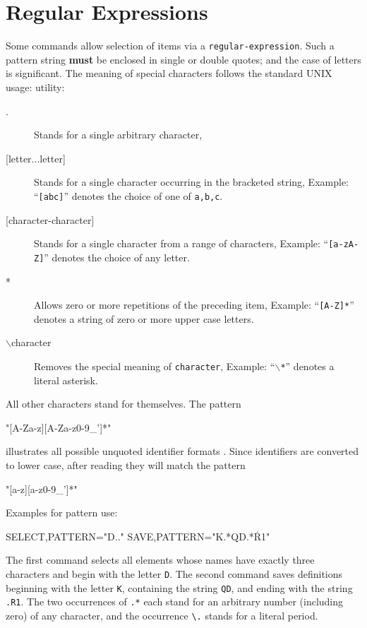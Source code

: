 \section{Regular Expressions}
\label{sec:wildcard}
Some commands allow selection of items via a \texttt{regular-expression}.
Such a pattern string \textbf{must} be enclosed in single or double quotes;
and the case of letters is significant.
The meaning of special characters follows the standard UNIX usage:
utility:
\begin{description}
\item[.]
Stands for a single arbitrary character,
\item[{[letter...letter]}]
Stands for a single character occurring in the bracketed string,
\noindent Example: ``\texttt{[abc]}'' denotes the choice of one of
\texttt{a,b,c}.
\item[{[character-character]}]
Stands for a single character from a range of characters,
\noindent Example: ``\texttt{[a-zA-Z]}'' denotes the choice of any letter.
\item[*]
Allows zero or more repetitions of the preceding item,
\noindent Example: ``\texttt{[A-Z]*}'' denotes a string of zero or more
upper case letters.
\item[$\backslash$character]
Removes the special meaning of \texttt{character},
\noindent Example: ``\texttt{$\backslash$*}'' denotes a literal asterisk.
\end{description}
All other characters stand for themselves.
The pattern
\begin{example}
"[A-Za-z][A-Za-z0-9_']*"
\end{example}
illustrates all possible unquoted identifier formats .
Since identifiers are converted to lower case,
after reading they will match the pattern
\begin{example}
"[a-z][a-z0-9_']*"
\end{example}
\noindent Examples for pattern use:
\begin{example}
SELECT,PATTERN="D.."
SAVE,PATTERN="K.*QD.*\.R1"
\end{example}
The first command selects all elements whose names have exactly three
characters and begin with the letter \texttt{D}.
The second command saves definitions beginning with the letter \texttt{K},
containing the string \texttt{QD}, and ending with the string \texttt{.R1}.
The two occurrences of \verb'.*' each stand for an arbitrary
number (including zero) of any character,
and the occurrence \verb'\.' stands for a literal period.

